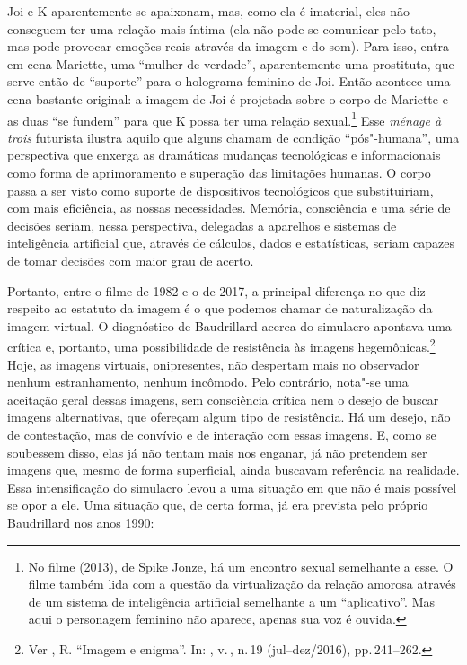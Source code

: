 Joi e K aparentemente se apaixonam, mas, como ela é imaterial, eles não
conseguem ter uma relação mais íntima (ela não pode se comunicar pelo
tato, mas pode provocar emoções reais através da imagem e do som). Para
isso, entra em cena Mariette, uma ``mulher de verdade'', aparentemente
uma prostituta, que serve então de ``suporte'' para o holograma feminino
de Joi. Então acontece uma cena bastante original: a imagem de Joi é
projetada sobre o corpo de Mariette e as duas ``se fundem'' para que K
possa ter uma relação sexual.\footnote{No filme {} (2013), de
  Spike Jonze, há um encontro sexual semelhante a esse. O filme também
  lida com a questão da virtualização da relação amorosa através de um
  sistema de inteligência artificial semelhante a um ``aplicativo''. Mas
  aqui o personagem feminino não aparece, apenas sua voz é ouvida.} Esse
\emph{ménage à trois} futurista ilustra aquilo que alguns chamam de
condição ``pós"-humana'', uma perspectiva que enxerga as dramáticas
mudanças tecnológicas e informacionais como forma de aprimoramento e
superação das limitações humanas. O corpo passa a ser visto como suporte
de dispositivos tecnológicos que substituiriam, com mais eficiência, as
nossas necessidades. Memória, consciência e uma série de decisões
seriam, nessa perspectiva, delegadas a aparelhos e sistemas de
inteligência artificial que, através de cálculos, dados e estatísticas,
seriam capazes de tomar decisões com maior grau de acerto.

Portanto, entre o filme de 1982 e o de 2017, a principal diferença no
que diz respeito ao estatuto da imagem é o que podemos chamar de
naturalização da imagem virtual. O diagnóstico de Baudrillard acerca do
simulacro apontava uma crítica e, portanto, uma possibilidade de
resistência às imagens hegemônicas.\footnote{Ver , R. ``Imagem e
  enigma''. In: {}, v.\,, n.\,19
  (jul–dez/2016), pp.\,241--262.} Hoje, as imagens virtuais,
onipresentes, não despertam mais no observador nenhum estranhamento,
nenhum incômodo. Pelo contrário, nota"-se uma aceitação geral dessas
imagens, sem consciência crítica nem o desejo de buscar imagens
alternativas, que ofereçam algum tipo de resistência. Há um desejo, não
de contestação, mas de convívio e de interação com essas imagens. E,
como se soubessem disso, elas já não tentam mais nos enganar, já não
pretendem ser imagens que, mesmo de forma superficial, ainda buscavam
referência na realidade. Essa intensificação do simulacro levou a uma
situação em que não é mais possível se opor a ele. Uma situação que, de
certa forma, já era prevista pelo próprio Baudrillard nos anos 1990:

